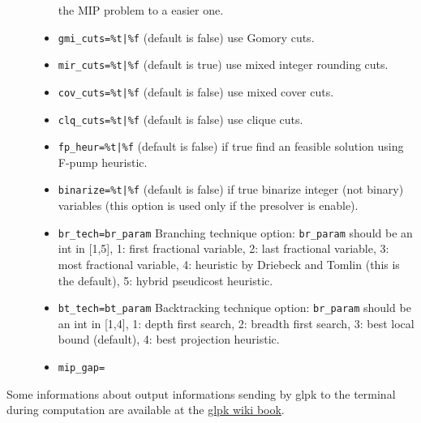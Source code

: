 \begin{mandescription}
\begin{description}
\begin{itemize}
      the MIP problem to a easier one.
\item \verb+gmi_cuts=%t|%f+ (default is false) use Gomory cuts.
\item \verb+mir_cuts=%t|%f+ (default is true) use mixed integer rounding cuts.
\item \verb+cov_cuts=%t|%f+ (default is false) use mixed cover cuts.
\item \verb+clq_cuts=%t|%f+ (default is false) use clique cuts.
\item \verb+fp_heur=%t|%f+ (default is false) if true find an feasible solution using F-pump heuristic.
\item \verb+binarize=%t|%f+ (default is false) if true binarize integer (not binary) variables (this 
      option is used only if the presolver is enable).
\item \verb+br_tech=br_param+ Branching technique option: \verb+br_param+ should be an int in [1,5],
      1: first fractional variable, 2: last fractional variable, 3: most fractional variable, 4:
      heuristic by Driebeck and Tomlin (this is the default), 5: hybrid pseudicost heuristic.
\item \verb+bt_tech=bt_param+ Backtracking technique option:  \verb+br_param+ should be an int in [1,4],
      1: depth first search, 2: breadth first search, 3: best local bound (default), 4: best projection heuristic.
\item \verb+mip_gap=+
\end{itemize}
\end{description}


Some informations about output informations sending by glpk to the terminal 
during computation are available at the 
\href{http://en.wikibooks.org/wiki/GLPK/Terminal_output}{glpk wiki book}.
 

\end{mandescription} 

